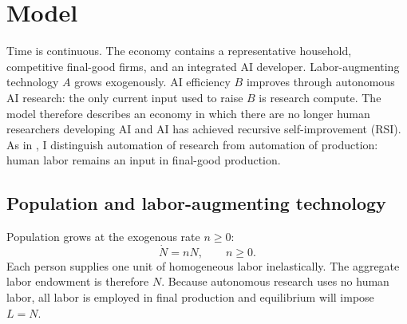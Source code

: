 \section{Model}
\label{sec:rewrite-model}

Time is continuous.  The economy contains a representative household, competitive final-good firms, and an integrated AI developer. Labor-augmenting technology $A$ grows exogenously. AI efficiency $B$ improves through autonomous AI research: the only current input used to raise $B$ is research compute. The model therefore describes an economy in which there are no longer human researchers developing AI and AI has achieved recursive self-improvement (RSI). As in \citet{trammellkorinek2023}, I distinguish automation of research from automation of production: human labor remains an input in final-good production.



\subsection{Population and labor-augmenting technology}
\label{subsec:rewrite-population}

Population grows at the exogenous rate $n\geq0$:
\begin{equation}
 \dot N=nN,
 \qquad n\geq0.
 \label{eq:rewrite-population}
\end{equation}
Each person supplies one unit of homogeneous labor inelastically. The aggregate labor endowment is therefore $N$. Because autonomous research uses no human labor, all labor is employed in final production and equilibrium will impose $L=N$.

